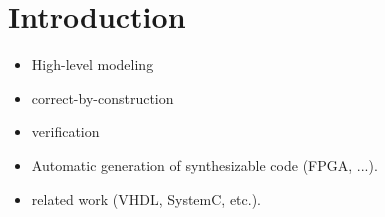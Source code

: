 \section{Introduction}
\label{sect-intro}

\begin{itemize}
\item High-level modeling 
\item correct-by-construction
\item verification
\item Automatic generation of synthesizable code  (FPGA, ...).
\item related work (VHDL, SystemC, etc.).
\end{itemize}

